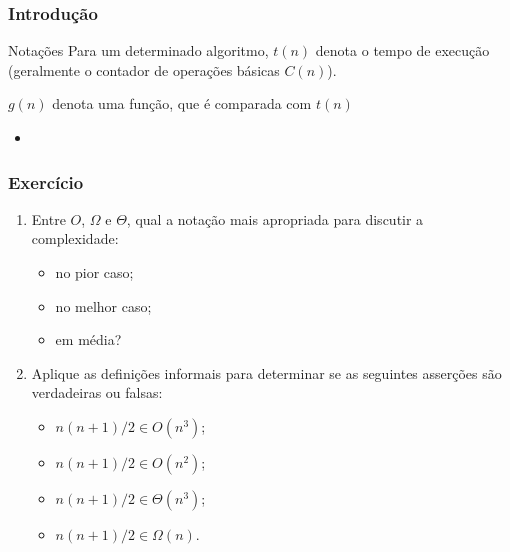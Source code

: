 \documentclass{beamer}
\begin{document}
\begin{frame}
  \frametitle{Introdução}

  \begin{block}{Notações}
    Para um determinado algoritmo, $t(n)$ denota o tempo de execução (geralmente o contador de operações básicas $C(n)$).

    $g(n)$ denota uma função, que é comparada com $t(n)$
  \end{block}
\pause
\begin{itemize}
\item 
{}
\pause
{}
\pause
{}
\end{itemize}

\end{frame}

\begin{frame}
\frametitle{Exercício}
\begin{enumerate}
\item Entre $O$, $\Omega$ e $\Theta$, qual a notação mais apropriada para discutir a complexidade:
\begin{itemize}
\item no pior caso;
\item no melhor caso;
\item em média?
\end{itemize}
\item Aplique as definições informais para determinar se as seguintes asserções
  são verdadeiras ou falsas:
\begin{itemize}
  \item $n(n+1)/2 \in O(n^3)$;
  \item $n(n+1)/2 \in O(n^2)$;
  \item $n(n+1)/2 \in \Theta(n^3)$;
  \item $n(n+1)/2 \in \Omega(n)$.
\end{itemize}
\end{enumerate}
\end{frame}
\end{document}
